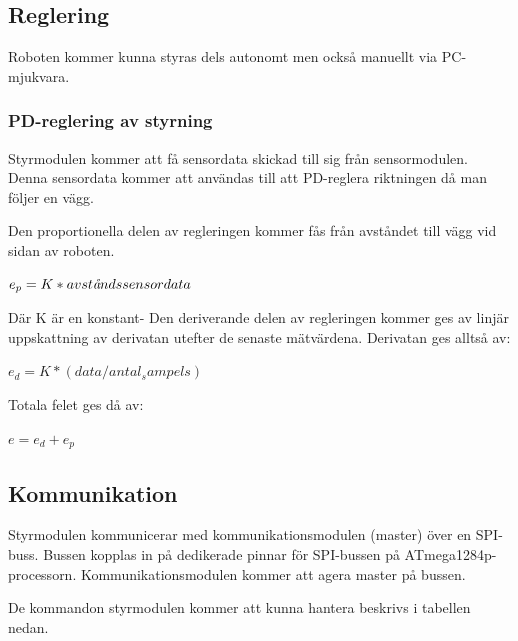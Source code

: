 \documentclass[a4paper,12pt,fleqn]{article}
\begin{document}
\subsection{Reglering}

Roboten kommer kunna styras dels autonomt men också manuellt via PC-mjukvara. 

\subsubsection{PD-reglering av styrning}
Styrmodulen kommer att få sensordata skickad till sig från sensormodulen. Denna sensordata kommer att användas till att PD-reglera riktningen då man följer en vägg. 

Den proportionella delen av regleringen kommer fås från avståndet till vägg vid sidan av roboten. 

$ e_p = K*avst\text{\it{å}}ndssensordata $

Där K är en konstant- Den deriverande delen av regleringen kommer ges av linjär uppskattning av derivatan utefter de senaste mätvärdena. Derivatan ges alltså av: 

$ e_d = K*(data/antal_sampels) $

Totala felet ges då av: 

$e = e_d + e_p$
\newpage



\subsection{Kommunikation}

Styrmodulen kommunicerar med kommunikationsmodulen (master) över en SPI-buss. Bussen kopplas in på dedikerade pinnar för SPI-bussen på ATmega1284p-processorn. Kommunikationsmodulen kommer att agera master på bussen. 

De kommandon styrmodulen kommer att kunna hantera beskrivs i tabellen nedan. \newline
\end{document}
